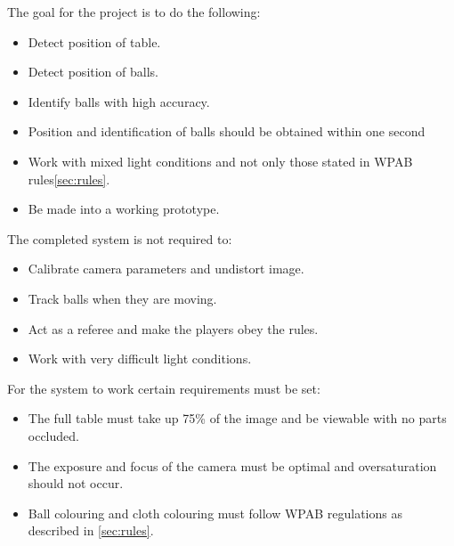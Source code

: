 The goal for the project is to do the following:

\begin{itemize}
\setlength{\itemsep}{0mm}
	\item Detect position of table.
	\item Detect position of balls.
	\item Identify balls with high accuracy.
	\item Position and identification of balls should be obtained within one second
	\item Work with mixed light conditions and not only those stated in WPAB rules\ref{sec:rules}.
	\item Be made into a working prototype.
\end{itemize}

The completed system is not required to:

\begin{itemize}
\setlength{\itemsep}{0mm}
	\item Calibrate camera parameters and undistort image.
	\item Track balls when they are moving.
	\item Act as a referee and make the players obey the rules.
	\item Work with very difficult light conditions.
\end{itemize}

For the system to work certain requirements must be set:
\begin{itemize}
\setlength{\itemsep}{0mm}
	\item The full table must take up 75\% of the image and  be viewable with no parts occluded.
	\item The exposure and focus of the camera must be optimal and oversaturation should not occur.
	\item Ball colouring and cloth colouring must follow WPAB regulations as described in \ref{sec:rules}.
\end{itemize}
